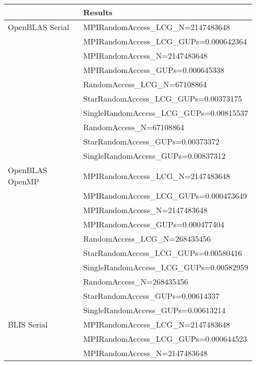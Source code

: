 \begin{table}[H]
\begin{center}
\begin{tabular}{ |l|l| } 
\hline
                & Results \\ 
\hline
OpenBLAS Serial & MPIRandomAccess\_LCG\_N=2147483648 \\
                & MPIRandomAccess\_LCG\_GUPs=0.000642364 \\
                \cline{2-2} 
                & MPIRandomAccess\_N=2147483648 \\
                & MPIRandomAccess\_GUPs=0.000645338 \\
                \cline{2-2} 
                & RandomAccess\_LCG\_N=67108864 \\
                & StarRandomAccess\_LCG\_GUPs=0.00373175 \\
                & SingleRandomAccess\_LCG\_GUPs=0.00815537 \\
                \cline{2-2} 
                & RandomAccess\_N=67108864 \\
                & StarRandomAccess\_GUPs=0.00373372 \\
                & SingleRandomAccess\_GUPs=0.00837312 \\ 
\hline
OpenBLAS OpenMP & MPIRandomAccess\_LCG\_N=2147483648 \\
                & MPIRandomAccess\_LCG\_GUPs=0.000473649 \\
                \cline{2-2} 
                & MPIRandomAccess\_N=2147483648 \\
                & MPIRandomAccess\_GUPs=0.000477404 \\
                \cline{2-2} 
                & RandomAccess\_LCG\_N=268435456 \\
                & StarRandomAccess\_LCG\_GUPs=0.00580416 \\
                & SingleRandomAccess\_LCG\_GUPs=0.00582959 \\
                \cline{2-2} 
                & RandomAccess\_N=268435456 \\
                & StarRandomAccess\_GUPs=0.00614337 \\
                & SingleRandomAccess\_GUPs=0.00613214 \\
\hline
BLIS Serial     & MPIRandomAccess\_LCG\_N=2147483648 \\
                & MPIRandomAccess\_LCG\_GUPs=0.000644523 \\
                \cline{2-2} 
                & MPIRandomAccess\_N=2147483648 \\

\end{tabular}
\end{center}
\end{table}
